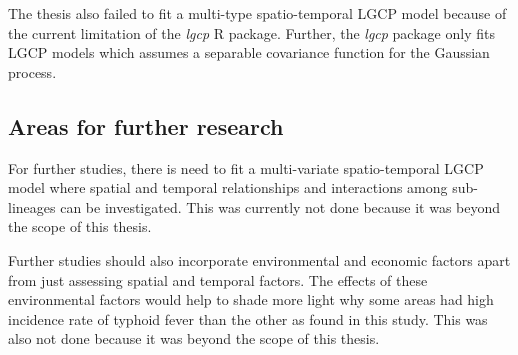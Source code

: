 \documentclass[12pt,a4paper]{report}
\begin{document}
The thesis also failed to fit a multi-type spatio-temporal LGCP model because of the current limitation of the \textit{lgcp} R package. Further, the \textit{lgcp} package only fits LGCP models which assumes a separable covariance function for the Gaussian process.

\subsection{Areas for further research}

For further studies, there is need to fit a multi-variate spatio-temporal LGCP model where spatial and temporal relationships and interactions among sub-lineages can be investigated. This was currently not done because it was beyond the scope of this thesis.

Further studies should also incorporate environmental and economic factors apart from just assessing spatial and temporal factors. The effects of these environmental factors would help to shade more light why some areas had high incidence rate of typhoid fever than the other as found in this study. This was also not done because it was beyond the scope of this thesis.
 

\renewcommand\bibname{REFERENCES} 
 
\end{document}
